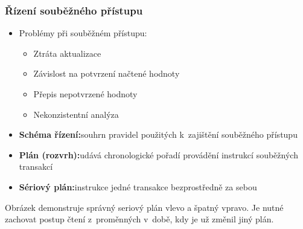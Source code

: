\documentclass[a4paper,10pt]{article}
\newcommand{\pojem}[2]{\item \textbf{#1:}\quad #2}
\begin{document}
        \subsubsection{Řízení souběžného přístupu}
        \begin{itemize}
          \item Problémy při souběžném přístupu:
          \begin{itemize}
            \item Ztráta aktualizace
            \item Závislost na potvrzení načtené hodnoty
            \item Přepis nepotvrzené hodnoty
            \item Nekonzistentní analýza
          \end{itemize}
          \pojem{Schéma řízení}{souhrn pravidel použitých k~zajištění souběžného přístupu}
          \pojem{Plán (rozvrh)}{udává chronologické pořadí provádění instrukcí souběžných transakcí}
          \pojem{Sériový plán}{instrukce jedné transakce bezprostředně za sebou}
        \end{itemize}
        \begin{figure}[h!]
          \centering
        \end{figure}
        Obrázek demonstruje správný seriový plán vlevo a špatný vpravo. Je nutné zachovat postup čtení z~proměnných v~době, kdy je už změnil jiný plán.
\end{document}
